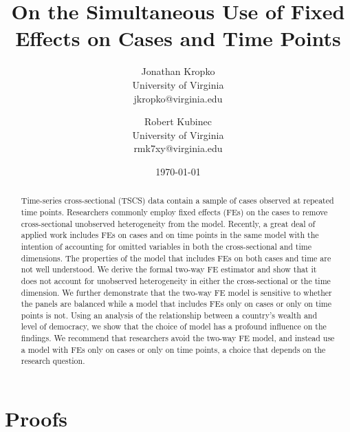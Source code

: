 \documentclass{article}[12pt]
\begin{document}
\title{On the Simultaneous Use of Fixed Effects on Cases and Time Points}
\date{\today}
\author{Jonathan Kropko\\ University of Virginia \\ jkropko@virginia.edu \and Robert Kubinec \\University of Virginia\\rmk7xy@virginia.edu}
\maketitle
\begin{abstract}
\noindent Time-series cross-sectional (TSCS) data contain a sample of cases observed at repeated time points.  Researchers commonly employ fixed effects (FEs) on the cases to remove cross-sectional unobserved heterogeneity from the model.  Recently, a great deal of applied work includes FEs on cases and on time points in the same model with the intention of accounting for omitted variables in both the cross-sectional and time dimensions.  The properties of the model that includes FEs on both cases and time are not well understood.  We derive the formal two-way FE estimator and show that it does not account for unobserved heterogeneity in either the cross-sectional or the time dimension.  We further demonstrate that the two-way FE model is sensitive to whether the panels are balanced while a model that includes FEs only on cases or only on time points is not.  Using an analysis of the relationship between a country's wealth and level of democracy, we show that the choice of model has a profound influence on the findings.  We recommend that researchers avoid the two-way FE model, and instead use a model with FEs only on cases or only on time points, a choice that depends on the research question. 
\end{abstract}

\newpage

\section{Proofs}
\end{document}
